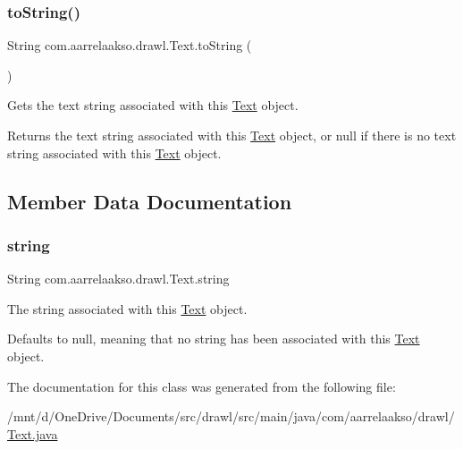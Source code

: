 \subsubsection{\texorpdfstring{to\+String()}{toString()}}
{\footnotesize\ttfamily String com.\+aarrelaakso.\+drawl.\+Text.\+to\+String (\begin{DoxyParamCaption}{ }\end{DoxyParamCaption})}



Gets the text string associated with this \hyperlink{classcom_1_1aarrelaakso_1_1drawl_1_1_text}{Text} object. 

\begin{DoxyReturn}{Returns}
the text string associated with this \hyperlink{classcom_1_1aarrelaakso_1_1drawl_1_1_text}{Text} object, or {\ttfamily null} if there is no text string associated with this \hyperlink{classcom_1_1aarrelaakso_1_1drawl_1_1_text}{Text} object. 
\end{DoxyReturn}


\subsection{Member Data Documentation}
\mbox{\label{classcom_1_1aarrelaakso_1_1drawl_1_1_text_a94bf15b06c72349f5d5a1bfc56496685}} 
\subsubsection{\texorpdfstring{string}{string}}
{\footnotesize\ttfamily String com.\+aarrelaakso.\+drawl.\+Text.\+string\hspace{0.3cm}{\ttfamily [private]}}



The string associated with this \hyperlink{classcom_1_1aarrelaakso_1_1drawl_1_1_text}{Text} object. 

Defaults to {\ttfamily null}, meaning that no string has been associated with this \hyperlink{classcom_1_1aarrelaakso_1_1drawl_1_1_text}{Text} object. 

The documentation for this class was generated from the following file\+:\begin{DoxyCompactItemize}
\item 
/mnt/d/\+One\+Drive/\+Documents/src/drawl/src/main/java/com/aarrelaakso/drawl/\hyperlink{_text_8java}{Text.\+java}\end{DoxyCompactItemize}

